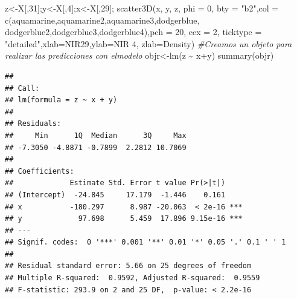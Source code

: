 \documentclass[
]{article}
\newenvironment{Shaded}{\begin{snugshade}}{\end{snugshade}}
\newcommand{\AttributeTok}[1]{\textcolor[rgb]{0.77,0.63,0.00}{#1}}
\newcommand{\CommentTok}[1]{\textcolor[rgb]{0.56,0.35,0.01}{\textit{#1}}}
\newcommand{\DecValTok}[1]{\textcolor[rgb]{0.00,0.00,0.81}{#1}}
\newcommand{\FunctionTok}[1]{\textcolor[rgb]{0.00,0.00,0.00}{#1}}
\newcommand{\NormalTok}[1]{#1}
\newcommand{\OtherTok}[1]{\textcolor[rgb]{0.56,0.35,0.01}{#1}}
\newcommand{\SpecialCharTok}[1]{\textcolor[rgb]{0.00,0.00,0.00}{#1}}
\newcommand{\StringTok}[1]{\textcolor[rgb]{0.31,0.60,0.02}{#1}}
\begin{document}
\begin{Shaded}
\begin{Highlighting}[]
\NormalTok{z}\OtherTok{\textless{}{-}}\NormalTok{X[,}\DecValTok{31}\NormalTok{];y}\OtherTok{\textless{}{-}}\NormalTok{X[,}\DecValTok{4}\NormalTok{];x}\OtherTok{\textless{}{-}}\NormalTok{X[,}\DecValTok{29}\NormalTok{];}
\FunctionTok{scatter3D}\NormalTok{(x, y, z, }\AttributeTok{phi =} \DecValTok{0}\NormalTok{, }\AttributeTok{bty =} \StringTok{"b2"}\NormalTok{,}\AttributeTok{col =} \FunctionTok{c}\NormalTok{(}\StringTok{\textquotesingle{}aquamarine\textquotesingle{}}\NormalTok{,}\StringTok{\textquotesingle{}aquamarine2\textquotesingle{}}\NormalTok{,}\StringTok{\textquotesingle{}aquamarine3\textquotesingle{}}\NormalTok{,}\StringTok{\textquotesingle{}dodgerblue\textquotesingle{}}\NormalTok{,}
\StringTok{\textquotesingle{}dodgerblue2\textquotesingle{}}\NormalTok{,}\StringTok{\textquotesingle{}dodgerblue3\textquotesingle{}}\NormalTok{,}\StringTok{\textquotesingle{}dodgerblue4\textquotesingle{}}\NormalTok{),}\AttributeTok{pch =} \DecValTok{20}\NormalTok{, }\AttributeTok{cex =} \DecValTok{2}\NormalTok{, }
\AttributeTok{ticktype =} \StringTok{"detailed"}\NormalTok{,}\AttributeTok{xlab=}\StringTok{\textquotesingle{}NIR29\textquotesingle{}}\NormalTok{,}\AttributeTok{ylab=}\StringTok{\textquotesingle{}NIR 4\textquotesingle{}}\NormalTok{, }\AttributeTok{zlab=}\StringTok{\textquotesingle{}Density\textquotesingle{}}\NormalTok{)}
\CommentTok{\#Creamos un objeto para realizar las predicciones con elmodelo}
\NormalTok{objr}\OtherTok{\textless{}{-}}\FunctionTok{lm}\NormalTok{(z }\SpecialCharTok{\textasciitilde{}}\NormalTok{ x}\SpecialCharTok{+}\NormalTok{y)}
\FunctionTok{summary}\NormalTok{(objr)}
\end{Highlighting}
\end{Shaded}

\begin{verbatim}
## 
## Call:
## lm(formula = z ~ x + y)
## 
## Residuals:
##     Min      1Q  Median      3Q     Max 
## -7.3050 -4.8871 -0.7899  2.2812 10.7069 
## 
## Coefficients:
##             Estimate Std. Error t value Pr(>|t|)    
## (Intercept)  -24.845     17.179  -1.446    0.161    
## x           -180.297      8.987 -20.063  < 2e-16 ***
## y             97.698      5.459  17.896 9.15e-16 ***
## ---
## Signif. codes:  0 '***' 0.001 '**' 0.01 '*' 0.05 '.' 0.1 ' ' 1
## 
## Residual standard error: 5.66 on 25 degrees of freedom
## Multiple R-squared:  0.9592, Adjusted R-squared:  0.9559 
## F-statistic: 293.9 on 2 and 25 DF,  p-value: < 2.2e-16
\end{verbatim}
\end{document}
